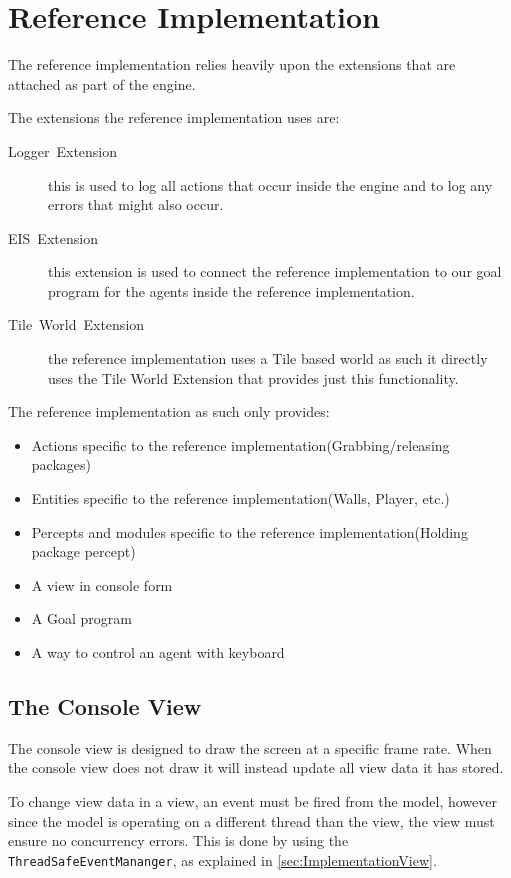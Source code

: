 
\section{Reference Implementation\label{sec:ImplementationReferenceImplementation}}

The reference implementation relies heavily upon the extensions that
are attached as part of the engine.

The extensions the reference implementation uses are:
\begin{description}
\item [{Logger~Extension}] this is used to log all actions that occur
inside the engine and to log any errors that might also occur.
\item [{EIS~Extension}] this extension is used to connect the reference
implementation to our goal program for the agents inside the reference
implementation.
\item [{Tile~World~Extension}] the reference implementation uses a Tile
based world as such it directly uses the Tile World Extension that
provides just this functionality.
\end{description}
The reference implementation as such only provides:
\begin{itemize}
\item Actions specific to the reference implementation(Grabbing/releasing
packages)
\item Entities specific to the reference implementation(Walls, Player, etc.)
\item Percepts and modules specific to the reference implementation(Holding
package percept)
\item A view in console form
\item A Goal program
\item A way to control an agent with keyboard
\end{itemize}

\subsection{The Console View}

The console view is designed to draw the screen at a specific frame
rate. When the console view does not draw it will instead update all
view data it has stored.

To change view data in a view, an event must be fired from the model,
however since the model is operating on a different thread than the
view, the view must ensure no concurrency errors. This is done by
using the \texttt{ThreadSafeEventMananger}, as explained in \ref{sec:ImplementationView}.

